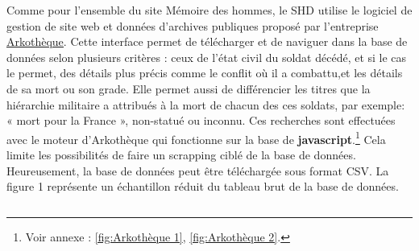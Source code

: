 Comme pour l'ensemble du site Mémoire des hommes, le SHD utilise le logiciel de gestion de site web et données d’archives publiques proposé par l’entreprise \href{http://www.arkotheque.fr/}{\underline{Arkothèque}}. Cette interface permet de télécharger et de naviguer dans la base de données selon plusieurs critères : ceux de l’état civil du soldat décédé, et si le cas le permet, des détails plus précis comme le conflit où il a combattu,et les détails de sa mort ou son grade. Elle permet aussi de différencier les titres que la hiérarchie militaire a attribués à la mort de chacun des ces soldats, par exemple: « mort pour la France », non-statué ou inconnu. Ces recherches sont effectuées avec le moteur d’Arkothèque qui fonctionne sur la  base de \textbf{javascript}.\footnote{Voir annexe : \ref{fig:Arkothèque 1}, \ref{fig:Arkothèque 2}.} Cela limite les possibilités de faire un scrapping ciblé de la base de données. Heureusement, la base de données peut être téléchargée sous format CSV. La figure 1 représente un échantillon réduit du tableau brut de la base de données.\begin{figure}[H]
    \hspace*{-2cm} 
    \caption{La base de données en format CSV}
    \label{fig:1}
     \begin{adjustwidth}{-2cm}{}
\begin{longtable}[c]{llllllllllllllllllllllllllllllllllllllllllllllllllllllllllllllllllllllllll}

\end{longtable}
\end{adjustwidth}
\end{figure}
